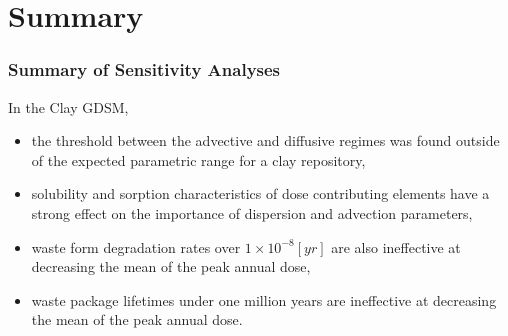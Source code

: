 
\section{Summary}
\begin{frame}[c]
  \frametitle{Summary of Sensitivity Analyses}
  In the Clay \gls{GDSM}, 
  \begin{itemize}
    \item the threshold between the advective and diffusive regimes was found 
      outside of the expected parametric range for a clay repository,
    \item solubility and sorption characteristics of dose contributing elements 
      have a strong effect on the importance of dispersion and advection 
      parameters,
    \item waste form degradation rates over $1\times10^{-8} [yr]$ are also 
      ineffective at decreasing the mean of the peak annual dose,
    \item waste package lifetimes under one million years are ineffective at 
      decreasing the mean of the peak annual dose.
  \end{itemize}
\end{frame}
